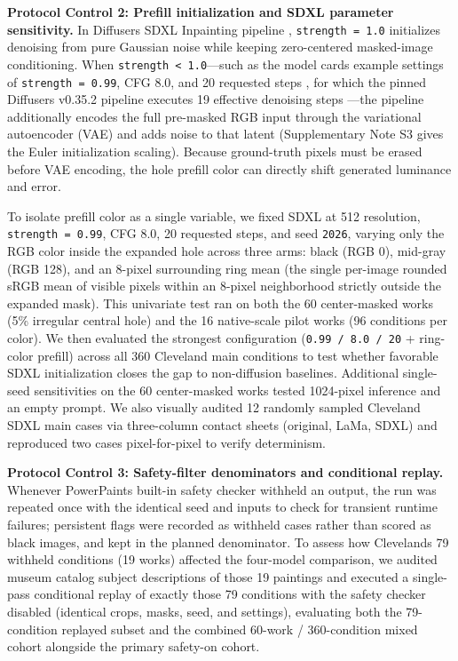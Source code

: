 \documentclass[fleqn,12pt,lineno]{wlpeerj}
\begin{document}
\textbf{Protocol Control 2: Prefill initialization and SDXL parameter sensitivity.} In Diffusers\textquotesingle{} SDXL Inpainting pipeline \citep{diffuserssdxl0352}, \texttt{strength\ =\ 1.0} initializes denoising from pure Gaussian noise while keeping zero-centered masked-image conditioning. When \texttt{strength\ \textless{}\ 1.0}---such as the model card\textquotesingle s example settings of \texttt{strength\ =\ 0.99}, CFG 8.0, and 20 requested steps \citep{sdxlinpaint}, for which the pinned Diffusers v0.35.2 pipeline executes 19 effective denoising steps \citep{diffuserssdxl0352}---the pipeline additionally encodes the full pre-masked RGB input through the variational autoencoder (VAE) and adds noise to that latent (Supplementary Note S3 gives the Euler initialization scaling). Because ground-truth pixels must be erased before VAE encoding, the hole prefill color can directly shift generated luminance and error.

To isolate prefill color as a single variable, we fixed SDXL at 512 resolution, \texttt{strength\ =\ 0.99}, CFG 8.0, 20 requested steps, and seed \texttt{2026}, varying only the RGB color inside the expanded hole across three arms: black (RGB 0), mid-gray (RGB 128), and an 8-pixel surrounding ring mean (the single per-image rounded sRGB mean of visible pixels within an 8-pixel neighborhood strictly outside the expanded mask). This univariate test ran on both the 60 center-masked works (5\% irregular central hole) and the 16 native-scale pilot works (96 conditions per color). We then evaluated the strongest configuration (\texttt{0.99\ /\ 8.0\ /\ 20} + ring-color prefill) across all 360 Cleveland main conditions to test whether favorable SDXL initialization closes the gap to non-diffusion baselines. Additional single-seed sensitivities on the 60 center-masked works tested 1024-pixel inference and an empty prompt. We also visually audited 12 randomly sampled Cleveland SDXL main cases via three-column contact sheets (original, LaMa, SDXL) and reproduced two cases pixel-for-pixel to verify determinism.

\textbf{Protocol Control 3: Safety-filter denominators and conditional replay.} Whenever PowerPaint\textquotesingle s built-in safety checker withheld an output, the run was repeated once with the identical seed and inputs to check for transient runtime failures; persistent flags were recorded as withheld cases rather than scored as black images, and kept in the planned denominator. To assess how Cleveland\textquotesingle s 79 withheld conditions (19 works) affected the four-model comparison, we audited museum catalog subject descriptions of those 19 paintings and executed a single-pass conditional replay of exactly those 79 conditions with the safety checker disabled (identical crops, masks, seed, and settings), evaluating both the 79-condition replayed subset and the combined 60-work / 360-condition mixed cohort alongside the primary safety-on cohort.
\end{document}
